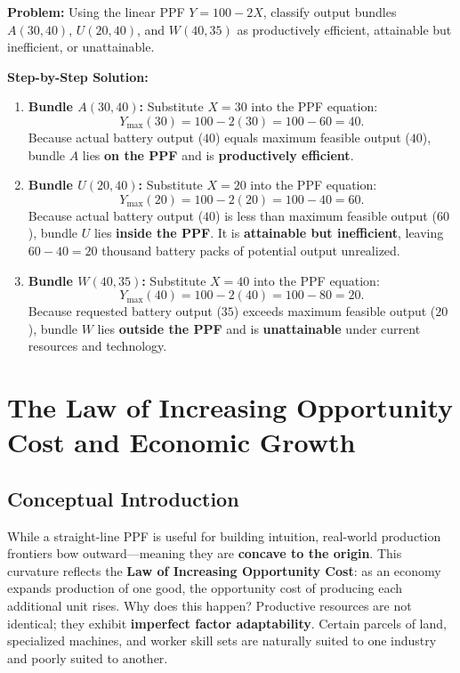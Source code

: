 \documentclass[11pt,letterpaper]{article}
\begin{document}
\begin{casestudy}
\textbf{Problem:} Using the linear PPF $Y = 100 - 2X$, classify output bundles $A(30, 40)$, $U(20, 40)$, and $W(40, 35)$ as productively efficient, attainable but inefficient, or unattainable.

\medskip
\noindent\textbf{Step-by-Step Solution:}
\begin{enumerate}
    \item \textbf{Bundle $A(30, 40)$:} Substitute $X = 30$ into the PPF equation:
    $$Y_{\max}(30) = 100 - 2(30) = 100 - 60 = 40.$$
    Because actual battery output ($40$) equals maximum feasible output ($40$), bundle $A$ lies \textbf{on the PPF} and is \textbf{productively efficient}.
    \item \textbf{Bundle $U(20, 40)$:} Substitute $X = 20$ into the PPF equation:
    $$Y_{\max}(20) = 100 - 2(20) = 100 - 40 = 60.$$
    Because actual battery output ($40$) is less than maximum feasible output ($60$), bundle $U$ lies \textbf{inside the PPF}. It is \textbf{attainable but inefficient}, leaving $60 - 40 = 20$ thousand battery packs of potential output unrealized.
    \item \textbf{Bundle $W(40, 35)$:} Substitute $X = 40$ into the PPF equation:
    $$Y_{\max}(40) = 100 - 2(40) = 100 - 80 = 20.$$
    Because requested battery output ($35$) exceeds maximum feasible output ($20$), bundle $W$ lies \textbf{outside the PPF} and is \textbf{unattainable} under current resources and technology.
\end{enumerate}
\end{casestudy}

\section{The Law of Increasing Opportunity Cost and Economic Growth}

\subsection*{Conceptual Introduction}
While a straight-line PPF is useful for building intuition, real-world production frontiers bow outward—meaning they are \textbf{concave to the origin}. This curvature reflects the \textbf{Law of Increasing Opportunity Cost}: as an economy expands production of one good, the opportunity cost of producing each additional unit rises. Why does this happen? Productive resources are not identical; they exhibit \textbf{imperfect factor adaptability}. Certain parcels of land, specialized machines, and worker skill sets are naturally suited to one industry and poorly suited to another.
\end{document}
